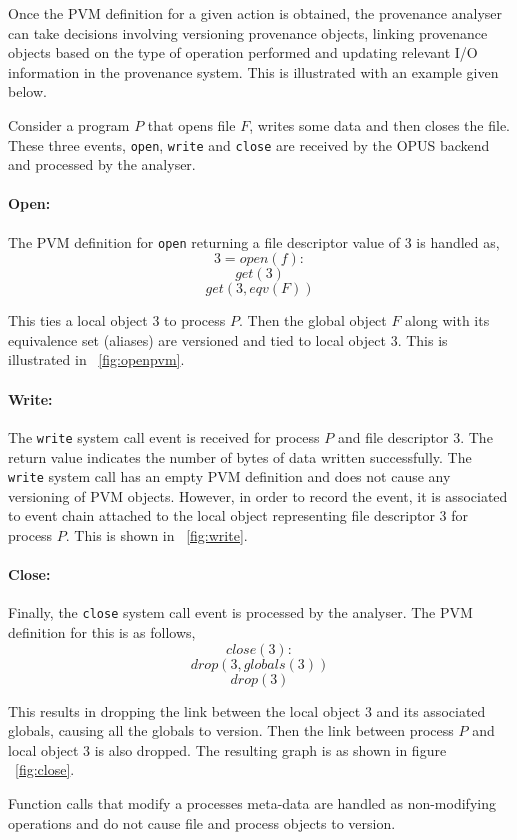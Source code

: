 \documentclass[withindex,glossary]{cam-thesis}
\begin{document}
Once the PVM definition for a given action is obtained, the provenance analyser can take decisions involving versioning provenance objects, linking provenance objects based on the type of operation performed and updating relevant I/O information in the provenance system.
This is illustrated with an example given below.

Consider a program $P$ that opens file $F$, writes some data and then closes the file. 
These three events, \texttt{open}, \texttt{write} and \texttt{close} are received by the OPUS backend and processed by the analyser.

\paragraph{Open:}
The PVM definition for \texttt{open} returning a file descriptor value of 3 is handled as,
$$3 = open(f):$$
$$get(3)$$
$$get(3, eqv(F))$$

This ties a local object $3$ to process $P$.
Then the global object $F$ along with its equivalence set (aliases) are versioned and tied to local object $3$.
This is illustrated in ~\ref{fig:openpvm}.

\paragraph{Write:}
The \texttt{write} system call event is received for process $P$ and file descriptor $3$.
The return value indicates the number of bytes of data written successfully.
The \texttt{write} system call has an empty PVM definition and does not cause any versioning of PVM objects.
However, in order to record the event, it is associated to event chain attached to the local object representing file descriptor $3$ for process $P$.
This is shown in ~\ref{fig:write}.

\paragraph{Close:}
Finally, the \texttt{close} system call event is processed by the analyser.
The PVM definition for this is as follows,
$$close(3):$$
$$drop(3, globals(3))$$
$$drop(3)$$

This results in dropping the link between the local object $3$ and its associated globals, causing all the globals to version.
Then the link between process $P$ and local object $3$ is also dropped.
The resulting graph is as shown in figure ~\ref{fig:close}.

Function calls that modify a processes meta-data are handled as non-modifying operations and do not cause file and process objects to version.
\end{document}
